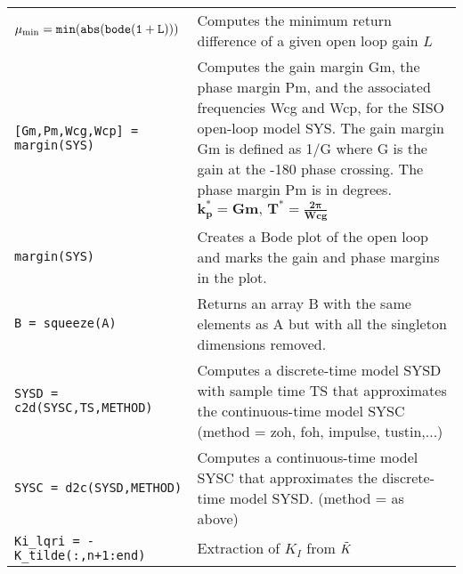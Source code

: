 \begin{center}
\begin{tabular}{p{5cm}|p{8.5cm}}
        $\mathtt{\mu_{\textnormal{min}} = min( abs(bode(1 + L)))}$  &  Computes the minimum return difference of a given open loop gain $L$\\
        
        \texttt{[Gm,Pm,Wcg,Wcp] = margin(SYS)}  & Computes the gain margin Gm, the phase margin Pm, and the associated frequencies Wcg and Wcp, for the SISO open-loop model SYS. The gain margin Gm is defined as 1/G where G is the gain at the -180 phase crossing. The phase margin Pm is in degrees. $\mathbf{k_p^* = Gm, \, T^* = \frac{2\pi}{Wcg}}$\\
        
        \texttt{margin(SYS)} & Creates a Bode plot of the open loop and marks the gain and phase margins in the plot. \\
        
        \texttt{B = squeeze(A)}  &  Returns an array B with the same elements as A but with all the singleton dimensions removed.\\
        
        \texttt{SYSD = c2d(SYSC,TS,METHOD)}  &  Computes a discrete-time model SYSD with sample time TS that approximates the continuous-time model SYSC (method = zoh, foh, impulse, tustin,...)\\
        
        \texttt{SYSC = d2c(SYSD,METHOD)} & Computes a continuous-time model SYSC that approximates the discrete-time model SYSD. (method = as above)\\
        
        \texttt{Ki\_lqri = -K\_tilde(:,n+1:end)} & Extraction of $K_I$ from $\Tilde{K}$
    \end{tabular}
\end{center}


\newpage
